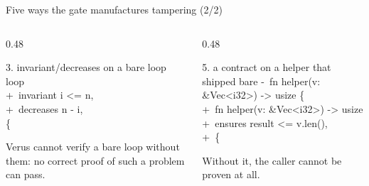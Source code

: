 \documentclass[aspectratio=169,10pt]{beamer}
\newcommand{\code}[1]{{\ttfamily #1}}
\begin{document}
\begin{frame}[fragile]{Five ways the gate manufactures tampering (2/2)}

\vspace{18pt}
\begin{columns}[T]
\begin{column}{0.48\textwidth}

\begin{codebox}[lgGrey]{3. \code{invariant}/\code{decreases} on a bare \code{loop}}
{\ttfamily\scriptsize
\phantom{+ }loop\\
{\color{lgGreen}+\ }\quad invariant i <= n,\\
{\color{lgGreen}+\ }\quad decreases n - i,\\
\phantom{+ }\{
}
\end{codebox}

\vspace{6pt}
{\scriptsize\color{lgGrey}Verus cannot verify a bare loop without them: no correct proof of
such a problem can pass.}

\end{column}
\begin{column}{0.48\textwidth}

\begin{codebox}[lgGrey]{5. a contract on a helper that shipped bare}
{\ttfamily\scriptsize
{\color{lgRed}-\ }fn helper(v: \&Vec<i32>) -> usize \{\\
{\color{lgGreen}+\ }fn helper(v: \&Vec<i32>) -> usize\\
{\color{lgGreen}+\ }\quad ensures result <= v.len(),\\
{\color{lgGreen}+\ }\{
}
\end{codebox}

\vspace{6pt}
{\scriptsize\color{lgGrey}Without it, the caller cannot be proven at all.}

\end{column}
\end{columns}

\end{frame}
\end{document}
